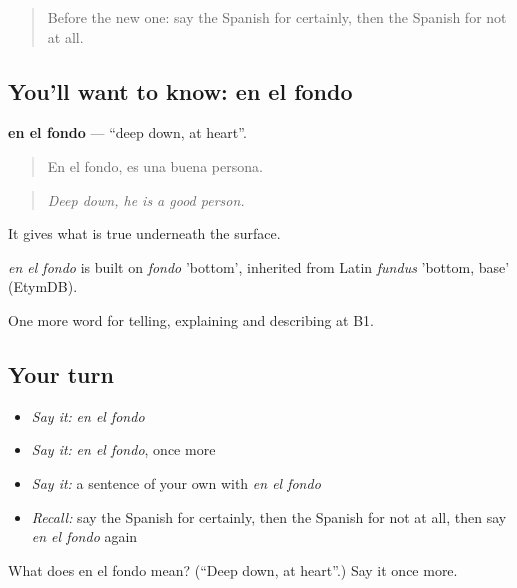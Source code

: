 \label{lesson:ES-C589-en-el-fondo}



\begin{quote}
Before the new one: say the Spanish for certainly, then the Spanish for not at all.
\end{quote}

\subsection*{You'll want to know: en el fondo}
\textbf{en el fondo} — \textquotedblleft{}deep down, at heart\textquotedblright{}.

\begin{quote}
En el fondo, es una buena persona.
\end{quote}

\begin{quote}
\emph{Deep down, he is a good person.}
\end{quote}

It gives what is true underneath the surface.

\begin{cousinweb}
\emph{en el fondo} is built on \emph{fondo} 'bottom', inherited from Latin \emph{fundus} 'bottom, base' (EtymDB).
\end{cousinweb}

\begin{grammarlens}[title={What you've built}]
One more word for telling, explaining and describing at B1.
\end{grammarlens}

\subsection*{Your turn}
\begin{itemize}
\raggedright
  \item \emph{Say it:} \emph{en el fondo}
  \item \emph{Say it:} \emph{en el fondo}, once more
  \item \emph{Say it:} a sentence of your own with \emph{en el fondo}
  \item \emph{Recall:} say the Spanish for certainly, then the Spanish for not at all, then say \emph{en el fondo} again
\end{itemize}

\begin{tcolorbox}[breakable,colback=teal!4,colframe=teal!35!black,title={Before you move on}]
What does en el fondo mean? (\textquotedblleft{}Deep down, at heart\textquotedblright{}.) Say it once more.
\end{tcolorbox}
